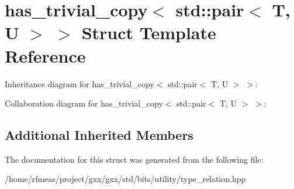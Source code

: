 \hypertarget{structhas__trivial__copy_3_01std_1_1pair_3_01T_00_01U_01_4_01_4}{}\section{has\+\_\+trivial\+\_\+copy$<$ std\+:\+:pair$<$ T, U $>$ $>$ Struct Template Reference}
\label{structhas__trivial__copy_3_01std_1_1pair_3_01T_00_01U_01_4_01_4}


Inheritance diagram for has\+\_\+trivial\+\_\+copy$<$ std\+:\+:pair$<$ T, U $>$ $>$\+:


Collaboration diagram for has\+\_\+trivial\+\_\+copy$<$ std\+:\+:pair$<$ T, U $>$ $>$\+:
\subsection*{Additional Inherited Members}


The documentation for this struct was generated from the following file\+:\begin{DoxyCompactItemize}
\item 
/home/rfmeas/project/gxx/gxx/std/bits/utility/type\+\_\+relation.\+hpp\end{DoxyCompactItemize}
